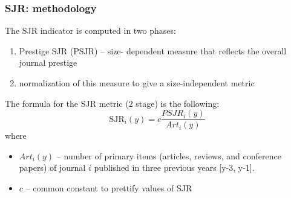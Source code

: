 \documentclass{beamer}
\begin{document}
\begin{frame}
    \frametitle{SJR: methodology}
    The SJR indicator is computed in two phases:
    \begin{enumerate}
        \item Prestige SJR (PSJR) -- size-
              dependent measure that reflects the overall journal prestige
        \item  normalization of this measure
              to give a size-independent metric
    \end{enumerate}

    The formula for the SJR metric (2 stage) is the following:
    \[
        \text{SJR}_i(y) = c \frac{PSJR_i(y)}{Art_i(y)}
    \]
    where
    \begin{itemize}
        \item $Art_i(y)$ -- number of primary items
              (articles, reviews, and conference papers) of journal $i$ published
              in three previous years [y-3, y-1].
        \item $c$ -- common constant to prettify values of SJR
    \end{itemize}
\end{frame}
\end{document}
